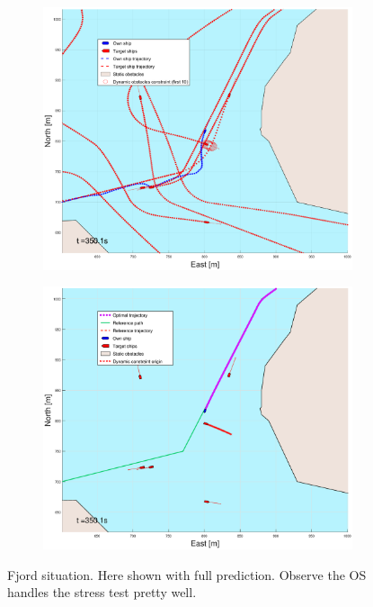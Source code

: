 \begin{figure}[ht!]
\begin{subfigure}[b]{0.499\textwidth}
    \end{subfigure}
    \hfill
    \\
    \begin{subfigure}[b]{0.49\textwidth}
        \centering
        \includegraphics[width=\textwidth]{Images/Figures/Trheimfjord/_Simple_0fig1_time=350}
    \end{subfigure}
    \hfill
    \begin{subfigure}[b]{0.499\textwidth}
        \centering
        \includegraphics[width=\textwidth]{Images/Figures/Trheimfjord/_Simple_0fig999_time=350}
    \end{subfigure}
    \hfill
    \caption{Fjord situation. Here shown with full prediction. Observe the \gls{OS} handles the stress test pretty well.}
    \label{FIG: Fjord with prediction}
\end{figure}

